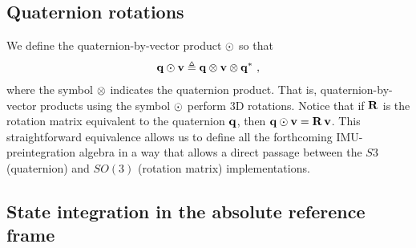 \subsection{Quaternion rotations}

We define the quaternion-by-vector product $\odot$ so that
%
\begin{align}
{\bf q}\odot{\bf v} \triangleq {\bf q}\otimes{\bf v}\otimes{\bf q}^*
~,
\end{align}
%
where the symbol $\otimes$ indicates the quaternion product.
That is, quaternion-by-vector products using the symbol $\odot$ perform 3D rotations. 
Notice that if ${\bf R}$ is the rotation matrix equivalent to the quaternion ${\bf q}$, then 
%
${\bf q}\odot{\bf v} = {\bf R}\,{\bf v}$. 
%
This straightforward equivalence
allows us to define all the forthcoming IMU-preintegration algebra in a way that allows a direct passage between the $S3$ (quaternion) and $SO(3)$ (rotation matrix) implementations.





\subsection{State integration in the absolute reference frame}

